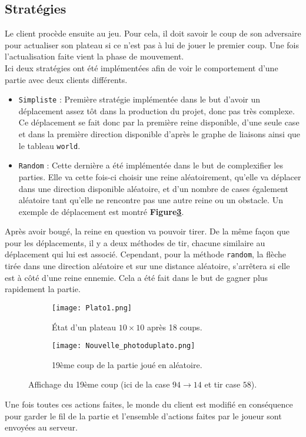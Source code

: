 \subsection{Stratégies}

Le client procède ensuite au jeu. Pour cela, il doit savoir le coup de son adversaire pour actualiser son plateau si ce n'est pas à lui de jouer le premier coup. Une fois l'actualisation faite vient la phase de mouvement.\\
Ici deux stratégies ont été implémentées afin de voir le comportement d'une partie avec deux clients différents. 
\begin{itemize}
    \item \texttt{Simpliste} : Première stratégie implémentée dans le but d'avoir un déplacement assez tôt dans la production du projet, donc pas très complexe. Ce déplacement se fait donc par la première reine disponible, d'une seule case et dans la première direction disponible d'après le graphe de liaisons ainsi que le tableau \texttt{world}.
    \medbreak
    \item \texttt{Random} : Cette dernière a été implémentée dans le but de complexifier les parties. Elle va cette fois-ci choisir une reine aléatoirement, qu'elle va déplacer dans une direction disponible aléatoire, et d'un nombre de cases également aléatoire tant qu'elle ne rencontre pas une autre reine ou un obstacle. Un exemple de déplacement est montré \textbf{Figure\ref{fig:gamestrat}}. 
    \medbreak
\end{itemize}
Après avoir bougé, la reine en question va pouvoir tirer. De la même façon que pour les déplacements, il y a deux méthodes de tir, chacune similaire au déplacement qui lui est associé. Cependant, pour la méthode \texttt{random}, la flèche tirée dans une direction aléatoire et sur une distance aléatoire, s'arrêtera si elle est à côté d'une reine ennemie. Cela a été fait dans le but de gagner plus rapidement la partie.

\begin{figure}[H]
    \centering
    \begin{subfigure}{0.4\textwidth}
        \centering
        \texttt{[image: Plato1.png]}
        \caption{État d'un plateau $10 \times 10$ après 18 coups. }
        \label{subfig:toblo}
    \end{subfigure}
    \hspace{1cm}
    \begin{subfigure}{0.52\textwidth}
        \centering
        \texttt{[image: Nouvelle\_photoduplato.png]}
        \caption{19ème coup de la partie joué en aléatoire.}
        \label{subfig: coupdeouf}
    \end{subfigure}
    \caption{Affichage du 19ème coup (ici de la case $94 \rightarrow 14$ et tir case $58$).}
    \label{fig:gamestrat}
\end{figure}
\medbreak
Une fois toutes ces actions faites, le monde du client est modifié en conséquence pour garder le fil de la partie et l'ensemble d'actions faites par le joueur sont envoyées au serveur.


